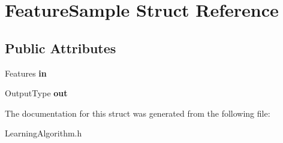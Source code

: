 \hypertarget{structFeatureSample}{
\section{FeatureSample Struct Reference}
\label{structFeatureSample}
}
\subsection*{Public Attributes}
\begin{DoxyCompactItemize}
\item 
\hypertarget{structFeatureSample_a7493028bd049f8bc81f419f0a0a6fda4}{
Features {\bfseries in}}
\label{structFeatureSample_a7493028bd049f8bc81f419f0a0a6fda4}

\item 
\hypertarget{structFeatureSample_aef42bb2ed655b922f9e00ac6c967c96b}{
OutputType {\bfseries out}}
\label{structFeatureSample_aef42bb2ed655b922f9e00ac6c967c96b}

\end{DoxyCompactItemize}


The documentation for this struct was generated from the following file:\begin{DoxyCompactItemize}
\item 
LearningAlgorithm.h\end{DoxyCompactItemize}
